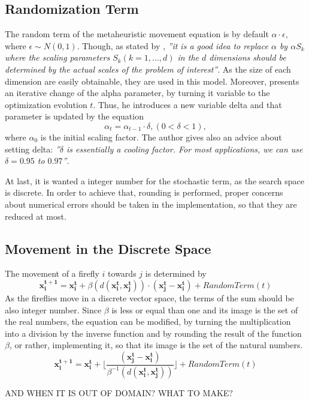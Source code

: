 \documentclass[tuberlin,cic,tc,openright,english,noabntcite,oneside]{iiufrgs}
\begin{document}
\subsection{Randomization Term}
The random term of the metaheuristic movement equation is by default $\alpha \cdot \epsilon$, where $\epsilon \sim N(0,1)$. Though, as stated by \textcite[p. 80]{yang_firefly_2010}, \emph{”it is a good idea to replace $\alpha$ by $\alpha S_k$ where the scaling parameters $S_k (k=1,...,d)$ in the $d$ dimensions should be determined by the actual scales of the problem of interest”}. As the size of each dimension are easily obtainable, they are used in this model. Moreover, \textcite[p. 37-38]{yang_firefly_2013} presents an iterative change of the alpha parameter, by turning it variable to the optimization evolution $t$. Thus, he introduces a new variable delta and that parameter is updated by the equation
$$ \alpha_t = \alpha_{t-1} \cdot \delta, (0 < \delta < 1),$$ where $\alpha_0$ is the initial scaling factor. The author gives also an advice about setting delta: \emph{”$\delta$ is essentially a cooling factor. For most applications, we can use $\delta = 0.95$ to $0.97$”}.

At last, it is wanted a integer number for the stochastic term, as the search space is discrete. In order to achieve that, rounding is performed, proper concerns about numerical errors should be taken in the implementation, so that they are reduced at most.

\subsection{Movement in the Discrete Space}
The movement of a firefly $i$ towards $j$ is determined by $$\mathbf{x^{t+1}_i} = \mathbf{x^{t}_i} + \beta(d(\mathbf{x^{t}_i}, \mathbf{x^{t}_j})) \cdot (\mathbf{x^{t}_j} - \mathbf{x^{t}_i}) + RandomTerm(t)$$
As the fireflies move in a discrete vector space, the terms of the sum should be also integer number. Since $\beta$ is less or equal than one and its image is the set of the real numbers, the equation can be modified, by turning the multiplication into a division by the inverse function and by rounding the result of the function $\beta$, or rather, implementing it, so that its image is the set of the natural numbers.
$$\mathbf{x^{t+1}_i} = \mathbf{x^{t}_i} +  \lfloor \frac{(\mathbf{x^{t}_j} - \mathbf{x^{t}_i})}{\beta^{-1}(d(\mathbf{x^{t}_i}, \mathbf{x^{t}_j}))} \rfloor + RandomTerm(t)$$

AND WHEN IT IS OUT OF DOMAIN? WHAT TO MAKE?
\end{document}
